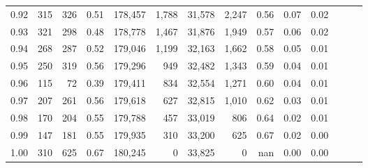 \begin{tabular}{rrrrrrrrrrrrrr}
0.92 &    315 &  326 &  0.51 &  178,457 &    1,788 &  31,578 &   2,247 &  0.56 &  0.07 &      0.02 \\
0.93 &    321 &  298 &  0.48 &  178,778 &    1,467 &  31,876 &   1,949 &  0.57 &  0.06 &      0.02 \\
0.94 &    268 &  287 &  0.52 &  179,046 &    1,199 &  32,163 &   1,662 &  0.58 &  0.05 &      0.01 \\
0.95 &    250 &  319 &  0.56 &  179,296 &      949 &  32,482 &   1,343 &  0.59 &  0.04 &      0.01 \\
0.96 &    115 &   72 &  0.39 &  179,411 &      834 &  32,554 &   1,271 &  0.60 &  0.04 &      0.01 \\
0.97 &    207 &  261 &  0.56 &  179,618 &      627 &  32,815 &   1,010 &  0.62 &  0.03 &      0.01 \\
0.98 &    170 &  204 &  0.55 &  179,788 &      457 &  33,019 &     806 &  0.64 &  0.02 &      0.01 \\
0.99 &    147 &  181 &  0.55 &  179,935 &      310 &  33,200 &     625 &  0.67 &  0.02 &      0.00 \\
1.00 &    310 &  625 &  0.67 &  180,245 &        0 &  33,825 &       0 &   nan &  0.00 &      0.00 \\
\bottomrule
\end{tabular}
